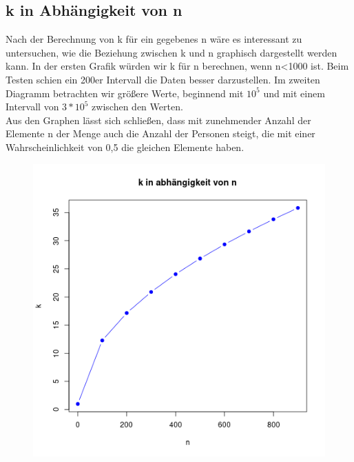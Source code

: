 \documentclass[course=erap]{aspdoc}
\begin{document}
\subsection{ k in Abhängigkeit von n}
Nach der Berechnung von k für ein gegebenes n wäre es interessant zu untersuchen, wie die Beziehung zwischen k und n graphisch dargestellt werden kann. In der ersten Grafik würden wir k für n berechnen, wenn n<1000 ist. Beim Testen schien ein 200er Intervall die Daten besser darzustellen.
Im zweiten Diagramm betrachten wir größere Werte, beginnend mit  $10^5$ und mit einem Intervall von $3*10^5$ zwischen den Werten.\\
Aus den Graphen lässt sich schließen, dass mit zunehmender Anzahl der Elemente n der Menge auch die Anzahl der Personen steigt, die mit einer Wahrscheinlichkeit von 0,5 die gleichen Elemente haben.
\begin{figure}[h!]
    \centering
    \begin{minipage}{.5\textwidth}
        \centering
        \includegraphics[width=.9\linewidth]{graphs/firstgraph.png}


\end{minipage}
\end{figure}
\end{document}
